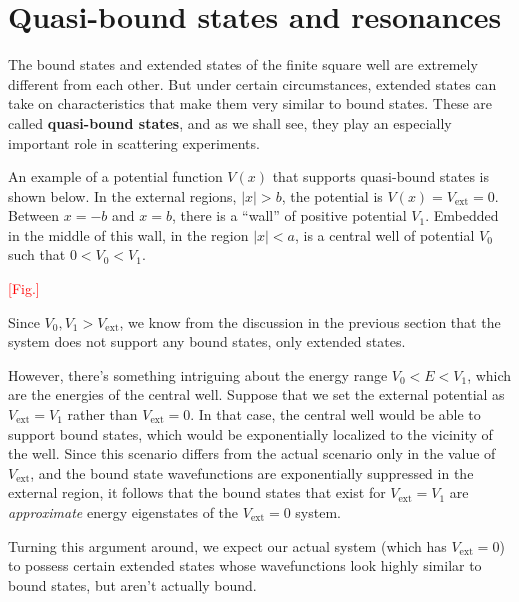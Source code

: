\documentclass[pra,12pt]{revtex4}
\begin{document}
\section{Quasi-bound states and resonances}

The bound states and extended states of the finite square well are
extremely different from each other.  But under certain circumstances,
extended states can take on characteristics that make them very
similar to bound states.  These are called \textbf{quasi-bound
  states}, and as we shall see, they play an especially important role
in scattering experiments.

An example of a potential function $V(x)$ that supports quasi-bound
states is shown below.  In the external regions, $|x| > b$, the
potential is $V(x) = V_{\textrm{ext}} = 0$.  Between $x = -b$ and $x =
b$, there is a ``wall'' of positive potential $V_1$.  Embedded in the
middle of this wall, in the region $|x| < a$, is a central well of
potential $V_0$ such that $0 < V_0 < V_1$.

\textcolor{red}{[Fig.]}

Since $V_0, V_1 > V_{\mathrm{ext}}$, we know from the discussion in
the previous section that the system does not support any bound
states, only extended states.

However, there's something intriguing about the energy range $V_0 < E
< V_1$, which are the energies of the central well.  Suppose that we
set the external potential as $V_{\mathrm{ext}} = V_1$ rather than
$V_{\mathrm{ext}} = 0$.  In that case, the central well would be able
to support bound states, which would be exponentially localized to the
vicinity of the well.  Since this scenario differs from the actual
scenario only in the value of $V_{\mathrm{ext}}$, and the bound state
wavefunctions are exponentially suppressed in the external region, it
follows that the bound states that exist for $V_{\mathrm{ext}} = V_1$
are \textit{approximate} energy eigenstates of the $V_{\mathrm{ext}} =
0$ system.

Turning this argument around, we expect our actual system (which has
$V_{\mathrm{ext}} = 0$) to possess certain extended states whose
wavefunctions look highly similar to bound states, but aren't actually
bound.
\end{document}
